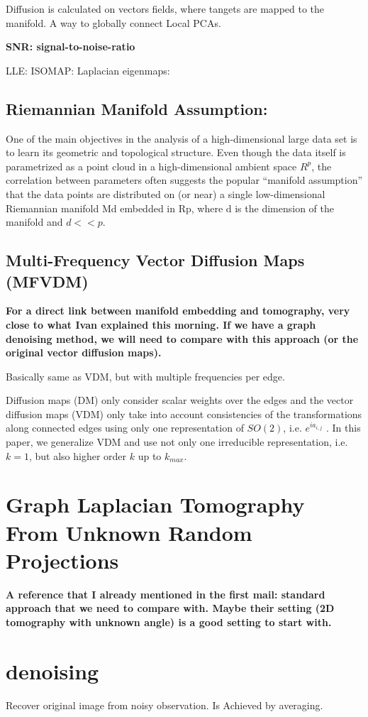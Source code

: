 Diffusion is calculated on vectors fields, where tangets are mapped to the manifold.
A way to globally connect Local PCAs.

\textbf{SNR: signal-to-noise-ratio}


LLE:
ISOMAP:
Laplacian eigenmaps:


\subsection{Riemannian Manifold Assumption:}
One of the main objectives in the analysis of a high-dimensional large data set
is to learn its geometric and topological structure. Even though the data itself is
parametrized as a point cloud in a high-dimensional ambient space $R^p$, the correlation
between parameters often suggests the popular “manifold assumption” that
the data points are distributed on (or near) a single low-dimensional Riemannian
manifold Md embedded in Rp, where d is the dimension of the manifold and
$d << p$.


\subsection{Multi-Frequency Vector Diffusion Maps (MFVDM)}
\cite{multiDiffusionMaps}
\textbf{For a direct link between manifold embedding and tomography, very close to what Ivan explained this morning.
If we have a graph denoising method, we will need to compare with this approach 
(or the original vector diffusion maps).}

Basically same as VDM, but with multiple frequencies per edge.

Diffusion maps (DM) only consider scalar weights over the edges and the vector
diffusion maps (VDM) only take into account consistencies
of the transformations along connected edges using only one
representation of $SO(2)$, i.e. $e^{ia_{i,j}}$ . In this paper, we generalize
VDM and use not only one irreducible representation,
i.e. $k = 1$, but also higher order $k$ up to $k_{max}$.


\section{Graph Laplacian Tomography From Unknown Random Projections}
\textbf{A reference that I already mentioned in the first mail:
standard approach that we need to compare with. 
Maybe their setting (2D tomography with unknown angle) is a good setting to start with.
}

\section{denoising}
Recover original image from noisy observation.
Is Achieved by averaging.

